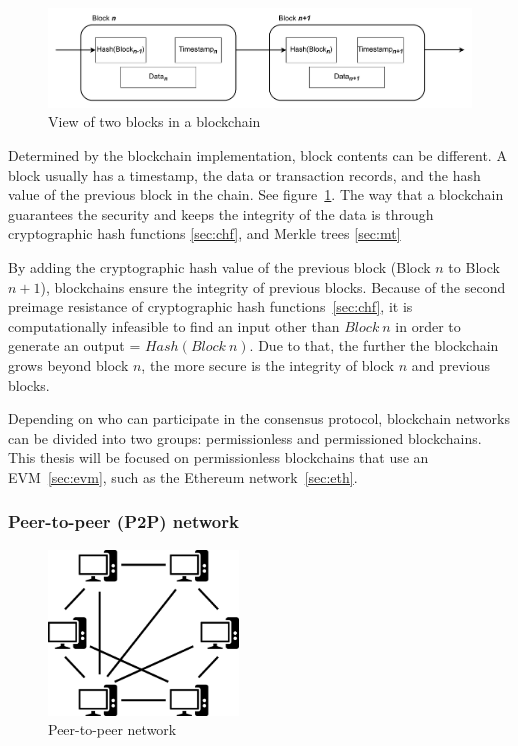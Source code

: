 \documentclass[11pt,a4paper]{report}
\begin{document}
\begin{figure}[htp]
	\centering
	\includegraphics[width=1\textwidth]{./images/bc}
	\caption{View of two blocks in a blockchain}
	\label{fig:bc}
\end{figure}

Determined by the blockchain implementation, block contents can be different. A block usually has a timestamp, the data or transaction records, and the hash value of the previous block in the chain. See figure~\ref{fig:bc}.
The way that a blockchain guarantees the security and keeps the integrity of the data is through cryptographic hash functions \ref{sec:chf}, and Merkle trees \ref{sec:mt}

By adding the cryptographic hash value of the previous block (Block $n$ to Block $n+1$), blockchains ensure the integrity of previous blocks. Because of the second preimage resistance of cryptographic hash functions~\ref{sec:chf}, it is computationally infeasible to find an input other than $Block~n$ in order to generate an output = $Hash (Block~n)$. Due to that, the further the blockchain grows beyond block $n$, the more secure is the integrity of block $n$ and previous blocks.

Depending on who can participate in the consensus protocol, blockchain networks can be divided into two groups: permissionless and permissioned blockchains. This thesis will be focused on permissionless blockchains that use an EVM~\ref{sec:evm}, such as the Ethereum network~\ref{sec:eth}.

\subsubsection{Peer-to-peer (P2P) network}\label{subsec:p2p}
\begin{figure}[htp]
	\centering
	\includegraphics[width=0.45\textwidth]{./images/p2p}
	\caption{Peer-to-peer network\cite{wiki:Peer-to-peer}}
	\label{fig:p2p}
\end{figure}
\end{document}
